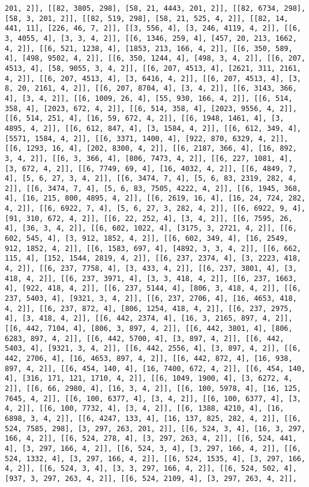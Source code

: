 \documentclass[12pt,fleqn]{article}\usepackage{../../common}
\begin{document}
\begin{verbatim}
201, 2]], [[82, 3805, 298], [58, 21, 4443, 201, 2]], [[82, 6734, 298], [58, 3, 201, 2]], [[82, 519, 298], [58, 21, 525, 4, 2]], [[82, 14, 441, 11], [226, 46, 7, 2]], [[3, 556, 4], [3, 246, 4119, 4, 2]], [[6, 3, 4055, 4], [3, 3, 4, 2]], [[6, 1346, 259, 4], [457, 20, 213, 1662, 4, 2]], [[6, 521, 1238, 4], [1853, 213, 166, 4, 2]], [[6, 350, 589, 4], [498, 9502, 4, 2]], [[6, 350, 1244, 4], [498, 3, 4, 2]], [[6, 207, 4513, 4], [58, 9055, 3, 4, 2]], [[6, 207, 4513, 4], [2621, 311, 2161, 4, 2]], [[6, 207, 4513, 4], [3, 6416, 4, 2]], [[6, 207, 4513, 4], [3, 8, 20, 2161, 4, 2]], [[6, 207, 8704, 4], [3, 4, 2]], [[6, 3143, 366, 4], [3, 4, 2]], [[6, 1009, 26, 4], [55, 930, 166, 4, 2]], [[6, 514, 358, 4], [2023, 672, 4, 2]], [[6, 514, 358, 4], [2023, 9556, 4, 2]], [[6, 514, 251, 4], [16, 59, 672, 4, 2]], [[6, 1948, 1461, 4], [3, 4895, 4, 2]], [[6, 612, 847, 4], [3, 1584, 4, 2]], [[6, 612, 349, 4], [5571, 1584, 4, 2]], [[6, 3371, 1400, 4], [922, 870, 6329, 4, 2]], [[6, 1293, 16, 4], [202, 8300, 4, 2]], [[6, 2187, 366, 4], [16, 892, 3, 4, 2]], [[6, 3, 366, 4], [806, 7473, 4, 2]], [[6, 227, 1081, 4], [3, 672, 4, 2]], [[6, 7749, 69, 4], [16, 4032, 4, 2]], [[6, 4849, 7, 4], [5, 6, 27, 3, 4, 2]], [[6, 3474, 7, 4], [5, 6, 83, 2319, 282, 4, 2]], [[6, 3474, 7, 4], [5, 6, 83, 7505, 4222, 4, 2]], [[6, 1945, 368, 4], [16, 215, 800, 4895, 4, 2]], [[6, 2619, 16, 4], [16, 24, 724, 282, 4, 2]], [[6, 6922, 7, 4], [5, 6, 27, 3, 282, 4, 2]], [[6, 6922, 9, 4], [91, 310, 672, 4, 2]], [[6, 22, 252, 4], [3, 4, 2]], [[6, 7595, 26, 4], [36, 3, 4, 2]], [[6, 602, 1022, 4], [3175, 3, 2721, 4, 2]], [[6, 602, 545, 4], [3, 912, 1852, 4, 2]], [[6, 602, 349, 4], [16, 2549, 912, 1852, 4, 2]], [[6, 1583, 697, 4], [4892, 3, 3, 4, 2]], [[6, 662, 115, 4], [152, 1544, 2819, 4, 2]], [[6, 237, 2374, 4], [3, 2223, 418, 4, 2]], [[6, 237, 7758, 4], [3, 433, 4, 2]], [[6, 237, 3801, 4], [3, 418, 4, 2]], [[6, 237, 3971, 4], [3, 3, 418, 4, 2]], [[6, 237, 1663, 4], [922, 418, 4, 2]], [[6, 237, 5144, 4], [806, 3, 418, 4, 2]], [[6, 237, 5403, 4], [9321, 3, 4, 2]], [[6, 237, 2706, 4], [16, 4653, 418, 4, 2]], [[6, 237, 872, 4], [806, 1254, 418, 4, 2]], [[6, 237, 2975, 4], [3, 418, 4, 2]], [[6, 442, 2374, 4], [16, 3, 2165, 897, 4, 2]], [[6, 442, 7104, 4], [806, 3, 897, 4, 2]], [[6, 442, 3801, 4], [806, 6283, 897, 4, 2]], [[6, 442, 5700, 4], [3, 897, 4, 2]], [[6, 442, 5403, 4], [9321, 3, 4, 2]], [[6, 442, 2556, 4], [3, 897, 4, 2]], [[6, 442, 2706, 4], [16, 4653, 897, 4, 2]], [[6, 442, 872, 4], [16, 938, 897, 4, 2]], [[6, 454, 140, 4], [16, 7400, 672, 4, 2]], [[6, 454, 140, 4], [316, 171, 121, 1710, 4, 2]], [[6, 1049, 1900, 4], [3, 6272, 4, 2]], [[6, 66, 2980, 4], [16, 3, 4, 2]], [[6, 100, 5978, 4], [16, 125, 7645, 4, 2]], [[6, 100, 6377, 4], [3, 4, 2]], [[6, 100, 6377, 4], [3, 4, 2]], [[6, 100, 7732, 4], [3, 4, 2]], [[6, 1388, 4210, 4], [16, 6898, 3, 4, 2]], [[6, 4247, 133, 4], [16, 137, 825, 282, 4, 2]], [[6, 524, 7585, 298], [3, 297, 263, 201, 2]], [[6, 524, 3, 4], [16, 3, 297, 166, 4, 2]], [[6, 524, 278, 4], [3, 297, 263, 4, 2]], [[6, 524, 441, 4], [3, 297, 166, 4, 2]], [[6, 524, 3, 4], [3, 297, 166, 4, 2]], [[6, 524, 1332, 4], [3, 297, 166, 4, 2]], [[6, 524, 1535, 4], [3, 297, 166, 4, 2]], [[6, 524, 3, 4], [3, 3, 297, 166, 4, 2]], [[6, 524, 502, 4], [937, 3, 297, 263, 4, 2]], [[6, 524, 2109, 4], [3, 297, 263, 4, 2]], 
\end{verbatim}
\end{document}

